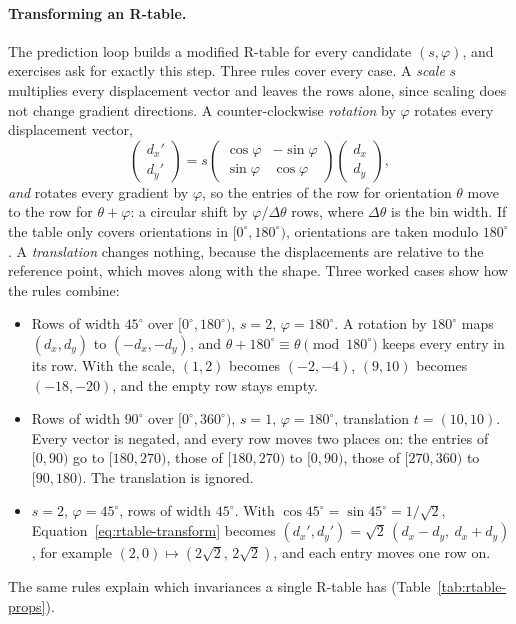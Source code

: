 \paragraph{Transforming an R-table.}
The prediction loop builds a modified R-table for every candidate $(s,\varphi)$,
and exercises ask for exactly this step. Three rules cover every case. A
\emph{scale} $s$ multiplies every displacement vector and leaves the rows
alone, since scaling does not change gradient directions. A counter-clockwise
\emph{rotation} by $\varphi$ rotates every displacement vector,
\begin{equation}
  \begin{pmatrix} d_x' \\ d_y' \end{pmatrix}
  = s
  \begin{pmatrix} \cos\varphi & -\sin\varphi \\ \sin\varphi & \cos\varphi
  \end{pmatrix}
  \begin{pmatrix} d_x \\ d_y \end{pmatrix},
  \label{eq:rtable-transform}
\end{equation}
\noindent
\emph{and} rotates every gradient by $\varphi$, so the entries of the row for
orientation $\theta$ move to the row for $\theta+\varphi$: a circular shift by
$\varphi/\Delta\theta$ rows, where $\Delta\theta$ is the bin width. If the table
only covers orientations in $[0^\circ,180^\circ)$, orientations are taken modulo
$180^\circ$. A \emph{translation} changes nothing, because the displacements are
relative to the reference point, which moves along with the shape.
Three worked cases show how the rules combine:
\begin{itemize}
  \item Rows of width $45^\circ$ over $[0^\circ,180^\circ)$, $s=2$,
        $\varphi = 180^\circ$. A rotation by $180^\circ$ maps $(d_x,d_y)$ to
        $(-d_x,-d_y)$, and $\theta + 180^\circ \equiv \theta \pmod{180^\circ}$
        keeps every entry in its row. With the scale, $(1,2)$ becomes
        $(-2,-4)$, $(9,10)$ becomes $(-18,-20)$, and the empty row stays empty.
  \item Rows of width $90^\circ$ over $[0^\circ,360^\circ)$, $s=1$,
        $\varphi = 180^\circ$, translation $t=(10,10)$. Every vector is negated,
        and every row moves two places on: the entries of $[0,90)$ go to
        $[180,270)$, those of $[180,270)$ to $[0,90)$, those of $[270,360)$ to
        $[90,180)$. The translation is ignored.
  \item $s=2$, $\varphi = 45^\circ$, rows of width $45^\circ$. With
        $\cos 45^\circ = \sin 45^\circ = 1/\sqrt2$,
        Equation~\eqref{eq:rtable-transform} becomes
        $(d_x',d_y') = \sqrt2\,(d_x - d_y,\ d_x + d_y)$, for example
        $(2,0)\mapsto(2\sqrt2,\,2\sqrt2)$, and each entry moves one row on.
\end{itemize}
\noindent
The same rules explain which invariances a single R-table has
(Table~\ref{tab:rtable-props}).

